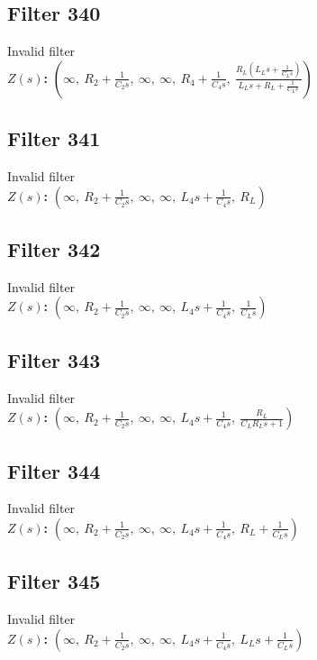 \documentclass{article}
\begin{document}
\subsection*{Filter 340}
Invalid filter \\ 
\textbf{$Z(s)$:} $\left( \infty, \  R_{2} + \frac{1}{C_{2} s}, \  \infty, \  \infty, \  R_{4} + \frac{1}{C_{4} s}, \  \frac{R_{L} \left(L_{L} s + \frac{1}{C_{L} s}\right)}{L_{L} s + R_{L} + \frac{1}{C_{L} s}}\right)$ \\ 
\subsection*{Filter 341}
Invalid filter \\ 
\textbf{$Z(s)$:} $\left( \infty, \  R_{2} + \frac{1}{C_{2} s}, \  \infty, \  \infty, \  L_{4} s + \frac{1}{C_{4} s}, \  R_{L}\right)$ \\ 
\subsection*{Filter 342}
Invalid filter \\ 
\textbf{$Z(s)$:} $\left( \infty, \  R_{2} + \frac{1}{C_{2} s}, \  \infty, \  \infty, \  L_{4} s + \frac{1}{C_{4} s}, \  \frac{1}{C_{L} s}\right)$ \\ 
\subsection*{Filter 343}
Invalid filter \\ 
\textbf{$Z(s)$:} $\left( \infty, \  R_{2} + \frac{1}{C_{2} s}, \  \infty, \  \infty, \  L_{4} s + \frac{1}{C_{4} s}, \  \frac{R_{L}}{C_{L} R_{L} s + 1}\right)$ \\ 
\subsection*{Filter 344}
Invalid filter \\ 
\textbf{$Z(s)$:} $\left( \infty, \  R_{2} + \frac{1}{C_{2} s}, \  \infty, \  \infty, \  L_{4} s + \frac{1}{C_{4} s}, \  R_{L} + \frac{1}{C_{L} s}\right)$ \\ 
\subsection*{Filter 345}
Invalid filter \\ 
\textbf{$Z(s)$:} $\left( \infty, \  R_{2} + \frac{1}{C_{2} s}, \  \infty, \  \infty, \  L_{4} s + \frac{1}{C_{4} s}, \  L_{L} s + \frac{1}{C_{L} s}\right)$ \\ 
\end{document}
